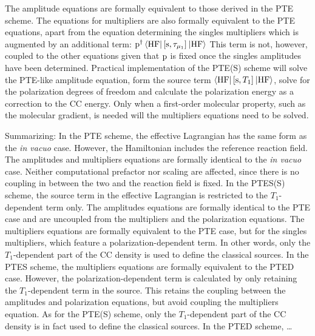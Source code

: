 The amplitude equations are formally equivalent to those derived in the
\acs{PTE} scheme. The equations for multipliers are also formally
equivalent to the \acs{PTE} equations, apart from the equation
determining the singles multipliers which is augmented by an additional term:
$\mathrm{p}^\dagger\braket{\mathrm{HF} | \left[ \mathrm{s}, \tau_{\mu_1} \right]^{} |
\mathrm{HF}}$
This term is not, however, coupled to the other equations given that
$\mathrm{p}$ is fixed once the singles amplitudes have been determined.
Practical implementation of the \acs{PTE(S)} scheme will solve the
\acs{PTE}-like amplitude equation, form the source term
$\braket{\mathrm{HF} | \left[ \mathrm{s}, T_1 \right]^{} | \mathrm{HF}}$, solve for
the polarization degrees of freedom and calculate the polarization
energy as a correction to the \acs{CC} energy.
Only when a first-order molecular property, such as the molecular
gradient, is needed will the multipliers equations need to be solved.

Summarizing:
In the \acs{PTE} scheme, the effective Lagrangian has the same form as
the \emph{in vacuo} case. However, the Hamiltonian includes the
reference reaction field. The amplitudes and multipliers equations
are formally identical to the \emph{in vacuo} case. Neither
computational prefactor nor scaling are affected, since there is no
coupling in between the two and the reaction field is fixed.
In the \acs{PTES(S)} scheme, the source term in the effective Lagrangian
is restricted to the $T_1$-dependent term only. The amplitudes
equations are formally identical to the \acs{PTE} case and are
uncoupled from the multipliers and the polarization equations.
The multipliers equations are formally equivalent to the \acs{PTE}
case, but for the singles multipliers, which feature a
polarization-dependent term.
In other words, only the $T_1$-dependent part of the \acs{CC} density is
used to define the classical sources.
In the \acs{PTES} scheme, the multipliers equations are formally
equivalent to the \acs{PTED} case. However, the
polarization-dependent term is calculated by only retaining the
$T_1$-dependent term in the source. This retains the coupling between the
amplitudes and polarization equations, but avoid coupling the
multipliers equation.
As for the \acs{PTE(S)} scheme, only the $T_1$-dependent part of the
\acs{CC} density is in fact used to define the classical sources.
In the \acs{PTED} scheme, \ldots


